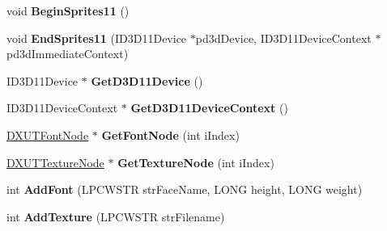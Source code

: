 \begin{DoxyCompactItemize}
\item 
\hypertarget{class_c_d_x_u_t_dialog_resource_manager_ab816479df8fd84f19e83ba5c2f36afc9}{void {\bfseries Begin\+Sprites11} ()}\label{class_c_d_x_u_t_dialog_resource_manager_ab816479df8fd84f19e83ba5c2f36afc9}

\item 
\hypertarget{class_c_d_x_u_t_dialog_resource_manager_a1cf898c761865509cdfc09bc39dd3e22}{void {\bfseries End\+Sprites11} (I\+D3\+D11\+Device $\ast$pd3d\+Device, I\+D3\+D11\+Device\+Context $\ast$pd3d\+Immediate\+Context)}\label{class_c_d_x_u_t_dialog_resource_manager_a1cf898c761865509cdfc09bc39dd3e22}

\item 
\hypertarget{class_c_d_x_u_t_dialog_resource_manager_ac25f878dca0bdcb818e205544d916042}{I\+D3\+D11\+Device $\ast$ {\bfseries Get\+D3\+D11\+Device} ()}\label{class_c_d_x_u_t_dialog_resource_manager_ac25f878dca0bdcb818e205544d916042}

\item 
\hypertarget{class_c_d_x_u_t_dialog_resource_manager_a90ebac8abc11eaf51fba9bf5c2bdbc9c}{I\+D3\+D11\+Device\+Context $\ast$ {\bfseries Get\+D3\+D11\+Device\+Context} ()}\label{class_c_d_x_u_t_dialog_resource_manager_a90ebac8abc11eaf51fba9bf5c2bdbc9c}

\item 
\hypertarget{class_c_d_x_u_t_dialog_resource_manager_a06bc003b7adeab308924d576872d7808}{\hyperlink{struct_d_x_u_t_font_node}{D\+X\+U\+T\+Font\+Node} $\ast$ {\bfseries Get\+Font\+Node} (int i\+Index)}\label{class_c_d_x_u_t_dialog_resource_manager_a06bc003b7adeab308924d576872d7808}

\item 
\hypertarget{class_c_d_x_u_t_dialog_resource_manager_a1c4a4da7f12745983dd5f3f945457b6f}{\hyperlink{struct_d_x_u_t_texture_node}{D\+X\+U\+T\+Texture\+Node} $\ast$ {\bfseries Get\+Texture\+Node} (int i\+Index)}\label{class_c_d_x_u_t_dialog_resource_manager_a1c4a4da7f12745983dd5f3f945457b6f}

\item 
\hypertarget{class_c_d_x_u_t_dialog_resource_manager_a469b81ccbb955b2841ba72d183761a08}{int {\bfseries Add\+Font} (L\+P\+C\+W\+S\+T\+R str\+Face\+Name, L\+O\+N\+G height, L\+O\+N\+G weight)}\label{class_c_d_x_u_t_dialog_resource_manager_a469b81ccbb955b2841ba72d183761a08}

\item 
\hypertarget{class_c_d_x_u_t_dialog_resource_manager_af5c09862641c351edb3753a36a87c79a}{int {\bfseries Add\+Texture} (L\+P\+C\+W\+S\+T\+R str\+Filename)}\label{class_c_d_x_u_t_dialog_resource_manager_af5c09862641c351edb3753a36a87c79a}


\end{DoxyCompactItemize}
